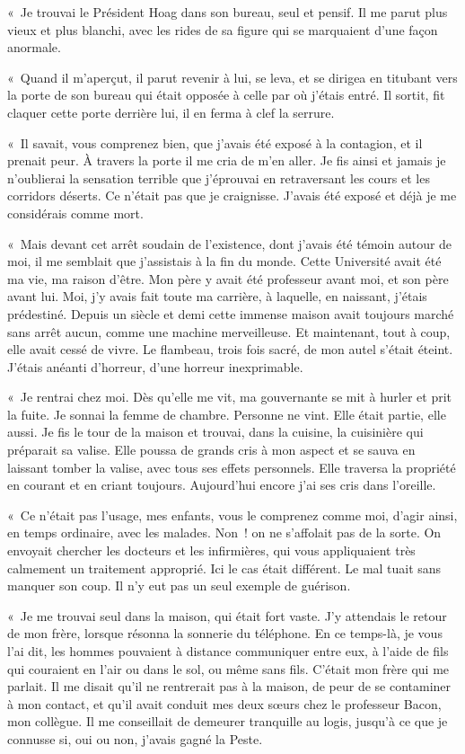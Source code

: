 \documentclass[french,twoside]{book} %
\begin{document}
« Je trouvai le Président Hoag dans son bureau, seul et pensif. Il me parut plus vieux et plus blanchi, avec les rides de sa figure qui se marquaient d’une façon anormale.\par
« Quand il m’aperçut, il parut revenir à lui, se leva, et se dirigea en titubant vers la porte de son bureau qui était opposée à celle par où j’étais entré. Il sortit, fit claquer cette porte derrière lui, il en ferma à clef la serrure.\par
« Il savait, vous comprenez bien, que j’avais été exposé à la contagion, et il prenait peur. À travers la porte il me cria de m’en aller. Je fis ainsi et jamais je n’oublierai la sensation terrible que j’éprouvai en retraversant les cours et les corridors déserts. Ce n’était pas que je craignisse. J’avais été exposé et déjà je me considérais comme mort.\par
« Mais devant cet arrêt soudain de l’existence, dont j’avais été témoin autour de moi, il me semblait que j’assistais à la fin du monde. Cette Université avait été ma vie, ma raison d’être. Mon père y avait été professeur avant moi, et son père avant lui. Moi, j’y avais fait toute ma carrière, à laquelle, en naissant, j’étais prédestiné. Depuis un siècle et demi cette immense maison avait toujours marché sans arrêt aucun, comme une machine merveilleuse. Et maintenant, tout à coup, elle avait cessé de vivre. Le flambeau, trois fois sacré, de mon autel s’était éteint. J’étais anéanti d’horreur, d’une horreur inexprimable.\par
« Je rentrai chez moi. Dès qu’elle me vit, ma gouvernante se mit à hurler et prit la fuite. Je sonnai la femme de chambre. Personne ne vint. Elle était partie, elle aussi. Je fis le tour de la maison et trouvai, dans la cuisine, la cuisinière qui préparait sa valise. Elle poussa de grands cris à mon aspect et se sauva en laissant tomber la valise, avec tous ses effets personnels. Elle traversa la propriété en courant et en criant toujours. Aujourd’hui encore j’ai ses cris dans l’oreille.\par
« Ce n’était pas l’usage, mes enfants, vous le comprenez comme moi, d’agir ainsi, en temps ordinaire, avec les malades. Non ! on ne s’affolait pas de la sorte. On envoyait chercher les docteurs et les infirmières, qui vous appliquaient très calmement un traitement approprié. Ici le cas était différent. Le mal tuait sans manquer son coup. Il n’y eut pas un seul exemple de guérison.\par
« Je me trouvai seul dans la maison, qui était fort vaste. J’y attendais le retour de mon frère, lorsque résonna la sonnerie du téléphone. En ce temps-là, je vous l’ai dit, les hommes pouvaient à distance communiquer entre eux, à l’aide de fils qui couraient en l’air ou dans le sol, ou même sans fils. C’était mon frère qui me parlait. Il me disait qu’il ne rentrerait pas à la maison, de peur de se contaminer à mon contact, et qu’il avait conduit mes deux sœurs chez le professeur Bacon, mon collègue. Il me conseillait de demeurer tranquille au logis, jusqu’à ce que je connusse si, oui ou non, j’avais gagné la Peste.\par
\end{document}
